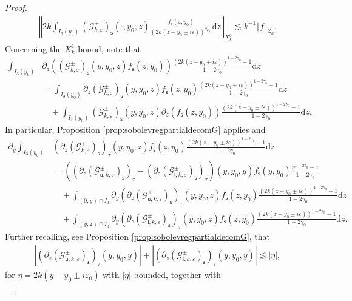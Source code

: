 \documentclass[11pt,reqno]{amsproc}
\theoremstyle{definition}
\numberwithin{equation}{section}
\newcommand{\G}{{\mathcal{G}}}
\newcommand{\s}{{\mathsf{s}}}
\newcommand{\su}{{\mathsf{u}}}
\renewcommand{\sl}{{\mathsf{l}}}
\renewcommand{\d}{\mathrm{d}}
\newcommand{\ep}{\varepsilon}
\begin{document}
\begin{proof}
\begin{align*}
\left \Vert 2k \int_{I_3(y_0)} \left( \G_{k,\ep}^\pm\right)_{\s}(\cdot,y_0,z) \frac{f_\s(z,y_0)}{(2k(z-y_0\pm i\ep))^{2\mu_0}} \d z \right\Vert_{X_k^0}   \lesssim  k^{-1} \Vert f \Vert_{Z_k^1}.
\end{align*}
Concerning the $X_k^1$ bound, note that
\begin{align*}
\int_{I_3(y_0)} &\partial_z \left( \left( \G_{k,\ep}^\pm\right)_{\s}(y,y_0,z)f_\s(z,y_0) \right)  \frac{(2k(z-y_0\pm i\ep))^{1-2\gamma_0} - 1}{1-2\gamma_0}  \d z \\
&=\int_{I_3(y_0)} \partial_z  \left( \G_{k,\ep}^\pm\right)_{\s}(y,y_0,z)f_\s(z,y_0)  \frac{(2k(z-y_0\pm i\ep))^{1-2\gamma_0} - 1}{1-2\gamma_0}  \d z \\ 
&\quad + \int_{I_3(y_0)}  \left( \G_{k,\ep}^\pm\right)_{\s}(y,y_0,z)\partial_z \left( f_\s(z,y_0) \right)  \frac{(2k(z-y_0\pm i\ep))^{1-2\gamma_0} - 1}{1-2\gamma_0}  \d z.
\end{align*}
In particular, Proposition \ref{prop:sobolevregpartialdecomG} applies and 
\begin{align*}
\partial_y \int_{I_3(y_0)} & \left(\partial_z  \left( \G_{k,\ep}^\pm\right)_{\s} \right)_\tau (y,y_0,z)f_\s(z,y_0)  \frac{(2k(z-y_0\pm i\ep))^{1-2\gamma_0} - 1}{1-2\gamma_0}  \d z \\
&= \left( \left(\partial_z \left( \G_{\su,k,\ep}^\pm\right)_\s \right)_\tau  - \left( \partial_z \left( \G_{\sl,k,\ep}^\pm\right)_\s \right)_\tau \right)(y,y_0,y) f_\s(y,y_0)\frac{\eta^{1-2\gamma_0}-1}{1-2\gamma_0} \\
&\quad +\int_{(0,y)\cap I_3} \partial_y \left(\partial_z \left( \G_{\su,k,\ep}^\pm\right)_\s\right)_\tau (y,y_0,z)  f_\s(z,y_0)  \frac{(2k(z-y_0\pm i\ep))^{1-2\gamma_0} - 1}{1-2\gamma_0} \d z \\
&\quad + \int_{(y,2)\cap I_3} \partial_y \left( \partial_z \left( \G_{\sl,k,\ep}^\pm\right)_\s \right)_\tau (y,y_0,z) f_\s(z,y_0)  \frac{(2k(z-y_0\pm i\ep))^{1-2\gamma_0} - 1}{1-2\gamma_0}  \d z. 
\end{align*}
Further recalling, see Proposition \ref{prop:sobolevregpartialdecomG},  that 
\begin{align*}
\left|  \left( \partial_z \left( \G_{\su,k,\ep}^\pm\right)_{\s} \right)_\tau (y,y_0,y) \right| + \left|  \left( \partial_z \left( \G_{\sl,k,\ep}^\pm\right)_{\s}\right)_\tau (y,y_0,y) \right| \lesssim |\eta|,
\end{align*}
for $\eta=2k(y-y_0\pm i\ep_0)$ with $|\eta|$ bounded, together with
\begin{align*}

\end{align*}
\end{proof}
\end{document}
